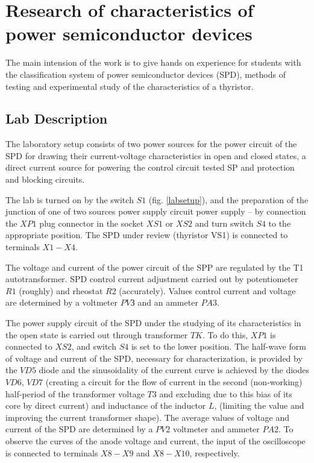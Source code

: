 \documentclass[a4paper,14pt]{article}
\begin{document}
\section{Research of characteristics of power semiconductor devices}

The main intension of the work is to give hands on experience for students 
with the classification system of power semiconductor devices (SPD),
methods of testing and experimental study of the characteristics of a thyristor.

\subsection{Lab Description}

The laboratory setup consists of two power sources for the power circuit of the SPD for drawing their current-voltage
characteristics in open and closed states, a direct current source for powering the control circuit
tested SP and protection and blocking circuits.

The lab is turned on by the switch $S1$ (fig. \ref{labsetup}), and the preparation of the junction of one of two sources
power supply circuit power supply -- by connection the $XP1$ plug connector in the socket $XS1$ or $XS2$ and turn
switch $S4$ to the appropriate position. The SPD under review (thyristor VS1) is connected to terminals $X1-X4$.

The voltage and current of the power circuit of the SPP are regulated by the T1 autotransformer. 
SPD control current adjustment
carried out by potentiometer $R1$ (roughly) and rheostat $R2$ (accurately). Values  control current and voltage
are determined by a voltmeter $PVЗ$ and an ammeter $PA3$.

The power supply circuit of the SPD under the studying of its characteristics 
in the open state is carried out through transformer $TK$. 
To do this, $XP1$ is connected to $XS2$, and switch $S4$ is set to the lower position.
The half-wave form of voltage and current of the SPD, necessary for characterization, 
is provided by the $VD5$ diode
and the sinusoidality of the current curve is achieved by the diodes $VD6$, $VD7$ 
(creating a circuit for the flow of current
in the second (non-working) half-period of the transformer voltage $T3$ and excluding due to this bias
of its core by direct current) and inductance of the inductor $L$, 
(limiting the value and improving the current transformer shape). 
The average values of voltage and current of the SPD are determined by a $PV2$ voltmeter
and ammeter $PA2$. To observe the curves of the anode voltage and current, 
the input of the oscilloscope is connected
to terminals $X8-X9$ and $X8-X10$, respectively.
\end{document}
